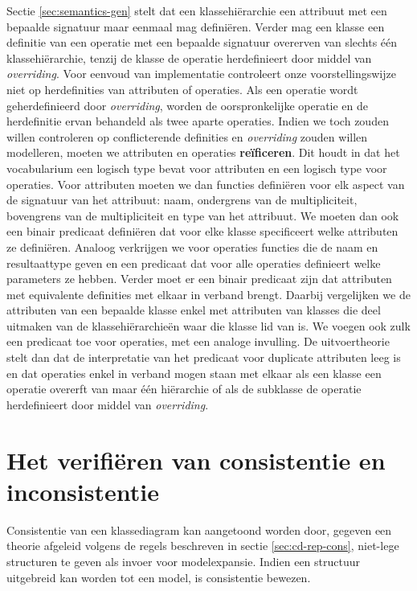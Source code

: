 Sectie \ref{sec:semantics-gen} stelt dat een klassehi\"erarchie een attribuut met een bepaalde signatuur maar eenmaal mag defini\"eren. Verder mag een klasse een definitie van een operatie met een bepaalde signatuur overerven van slechts \'e\'en klassehi\"erarchie, tenzij de klasse de operatie herdefinieert door middel van \textit{overriding}. Voor eenvoud van implementatie controleert onze voorstellingswijze niet op herdefinities van attributen of operaties. Als een operatie wordt geherdefinieerd door \textit{overriding}, worden de oorspronkelijke operatie en de herdefinitie ervan behandeld als twee aparte operaties. Indien we toch zouden willen controleren op conflicterende definities en \textit{overriding} zouden willen modelleren, moeten we attributen en operaties \textbf{re\"ificeren}. Dit houdt in dat het vocabularium een logisch type bevat voor attributen en een logisch type voor operaties. Voor attributen moeten we dan functies defini\"eren voor elk aspect van de signatuur van het attribuut: naam, ondergrens van de multipliciteit, bovengrens van de multipliciteit en type van het attribuut. We moeten dan ook een binair predicaat defini\"eren dat voor elke klasse specificeert welke attributen ze defini\"eren. Analoog verkrijgen we voor operaties functies die de naam en resultaattype geven en een predicaat dat voor alle operaties definieert welke parameters ze hebben. Verder moet er een binair predicaat zijn dat attributen met equivalente definities met elkaar in verband brengt. Daarbij vergelijken we de attributen van een bepaalde klasse enkel met attributen van klasses die deel uitmaken van de klassehi\"erarchie\"en waar die klasse lid van is. We voegen ook zulk een predicaat toe voor operaties, met een analoge invulling. De uitvoertheorie stelt dan dat de interpretatie van het predicaat voor duplicate attributen leeg is en dat operaties enkel in verband mogen staan met elkaar als een klasse een operatie overerft van maar \'e\'en hi\"erarchie of als de subklasse de operatie herdefinieert door middel van \textit{overriding}.

\section{Het verifi\"eren van consistentie en inconsistentie}

Consistentie van een klassediagram kan aangetoond worden door, gegeven een theorie afgeleid volgens de regels beschreven in sectie \ref{sec:cd-rep-cons}, niet-lege structuren te geven als invoer voor modelexpansie. Indien een structuur uitgebreid kan worden tot een model, is consistentie bewezen.

